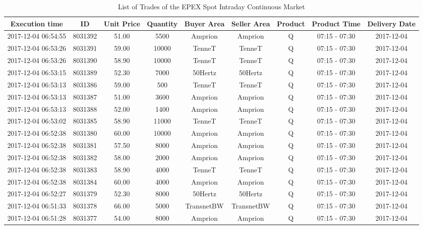 \documentclass[a4paper, 12pt]{article}
\begin{document}
{\captionsetup[table]{aboveskip=0.5cm}
\begin{table}
\caption{List of Trades of the EPEX Spot Intraday Continuous Market \label{table-spot-market}}
\centering
\begin{tabular}{c|cccccccc}
\hline
\hline
Execution time & ID & Unit Price & Quantity & Buyer Area & Seller Area & Product & Product Time & Delivery Date\\
\hline
2017-12-04 06:54:55 & 8031392 & 51.00 & 5500 & Amprion & Amprion & Q & 07:15 - 07:30 & 2017-12-04\\
2017-12-04 06:53:26 & 8031391 & 59.00 & 10000 & TenneT & TenneT & Q & 07:15 - 07:30 & 2017-12-04\\
2017-12-04 06:53:26 & 8031390 & 58.90 & 10000 & TenneT & TenneT & Q & 07:15 - 07:30 & 2017-12-04\\
2017-12-04 06:53:15 & 8031389 & 52.30 & 7000 & 50Hertz & 50Hertz & Q & 07:15 - 07:30 & 2017-12-04\\
2017-12-04 06:53:13 & 8031386 & 59.00 & 500 & TenneT & TenneT & Q & 07:15 - 07:30 & 2017-12-04\\
2017-12-04 06:53:13 & 8031387 & 51.00 & 3600 & Amprion & Amprion & Q & 07:15 - 07:30 & 2017-12-04\\
2017-12-04 06:53:13 & 8031388 & 52.00 & 1400 & Amprion & Amprion & Q & 07:15 - 07:30 & 2017-12-04\\
2017-12-04 06:53:02 & 8031385 & 58.90 & 11000 & TenneT & TenneT & Q & 07:15 - 07:30 & 2017-12-04\\
2017-12-04 06:52:38 & 8031380 & 60.00 & 10000 & Amprion & Amprion & Q & 07:15 - 07:30 & 2017-12-04\\
2017-12-04 06:52:38 & 8031381 & 57.50 & 8000 & Amprion & Amprion & Q & 07:15 - 07:30 & 2017-12-04\\
2017-12-04 06:52:38 & 8031382 & 58.00 & 2000 & Amprion & Amprion & Q & 07:15 - 07:30 & 2017-12-04\\
2017-12-04 06:52:38 & 8031383 & 58.90 & 4000 & TenneT & TenneT & Q & 07:15 - 07:30 & 2017-12-04\\
2017-12-04 06:52:38 & 8031384 & 60.00 & 4000 & Amprion & Amprion & Q & 07:15 - 07:30 & 2017-12-04\\
2017-12-04 06:52:27 & 8031379 & 52.30 & 8000 & 50Hertz & 50Hertz & Q & 07:15 - 07:30 & 2017-12-04\\
2017-12-04 06:51:33 & 8031378 & 66.00 & 5000 & TransnetBW & TransnetBW & Q & 07:15 - 07:30 & 2017-12-04\\
2017-12-04 06:51:28 & 8031377 & 54.00 & 8000 & Amprion & Amprion & Q & 07:15 - 07:30 & 2017-12-04\\

\end{tabular}
\end{table}}
\end{document}
